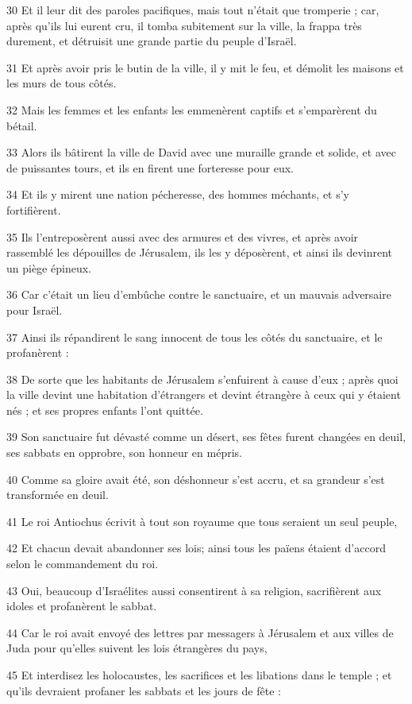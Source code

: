 \par 30 Et il leur dit des paroles pacifiques, mais tout n'était que tromperie ; car, après qu'ils lui eurent cru, il tomba subitement sur la ville, la frappa très durement, et détruisit une grande partie du peuple d'Israël.
\par 31 Et après avoir pris le butin de la ville, il y mit le feu, et démolit les maisons et les murs de tous côtés.
\par 32 Mais les femmes et les enfants les emmenèrent captifs et s'emparèrent du bétail.
\par 33 Alors ils bâtirent la ville de David avec une muraille grande et solide, et avec de puissantes tours, et ils en firent une forteresse pour eux.
\par 34 Et ils y mirent une nation pécheresse, des hommes méchants, et s'y fortifièrent.
\par 35 Ils l'entreposèrent aussi avec des armures et des vivres, et après avoir rassemblé les dépouilles de Jérusalem, ils les y déposèrent, et ainsi ils devinrent un piège épineux.
\par 36 Car c'était un lieu d'embûche contre le sanctuaire, et un mauvais adversaire pour Israël.
\par 37 Ainsi ils répandirent le sang innocent de tous les côtés du sanctuaire, et le profanèrent :
\par 38 De sorte que les habitants de Jérusalem s'enfuirent à cause d'eux ; après quoi la ville devint une habitation d'étrangers et devint étrangère à ceux qui y étaient nés ; et ses propres enfants l'ont quittée.
\par 39 Son sanctuaire fut dévasté comme un désert, ses fêtes furent changées en deuil, ses sabbats en opprobre, son honneur en mépris.
\par 40 Comme sa gloire avait été, son déshonneur s'est accru, et sa grandeur s'est transformée en deuil.
\par 41 Le roi Antiochus écrivit à tout son royaume que tous seraient un seul peuple,
\par 42 Et chacun devait abandonner ses lois; ainsi tous les païens étaient d'accord selon le commandement du roi.
\par 43 Oui, beaucoup d'Israélites aussi consentirent à sa religion, sacrifièrent aux idoles et profanèrent le sabbat.
\par 44 Car le roi avait envoyé des lettres par messagers à Jérusalem et aux villes de Juda pour qu'elles suivent les lois étrangères du pays,
\par 45 Et interdisez les holocaustes, les sacrifices et les libations dans le temple ; et qu'ils devraient profaner les sabbats et les jours de fête :
